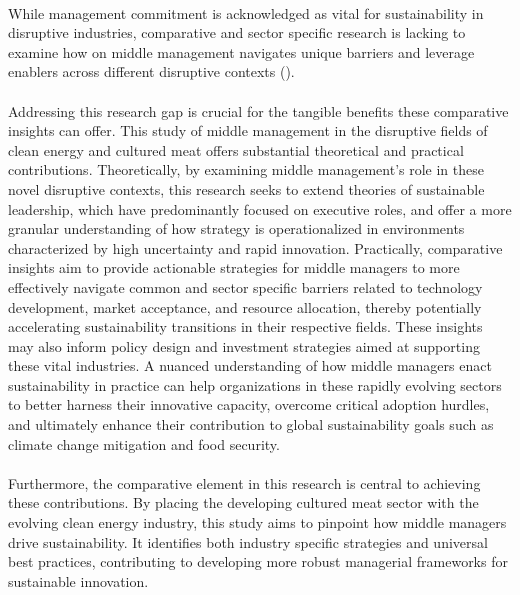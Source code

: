 \paragraph*{} While management commitment is acknowledged as vital for sustainability in disruptive industries, comparative and sector specific research is lacking to examine how on middle management navigates unique barriers and leverage enablers across different disruptive contexts (\textcite{Lozano2015, Egri2000}).

\paragraph*{} Addressing this research gap is crucial for the tangible benefits these comparative insights can offer. This study of middle management in the disruptive fields of clean energy and cultured meat offers substantial theoretical and practical contributions. 
Theoretically, by examining middle management's role in these novel disruptive contexts, this research seeks to extend theories of sustainable leadership, which have predominantly focused on executive roles, and offer a more granular understanding of how strategy is operationalized in environments characterized by high uncertainty and rapid innovation.
Practically, comparative insights aim to provide actionable strategies for middle managers to more effectively navigate common and sector specific barriers related to technology development, market acceptance, and resource allocation, thereby potentially accelerating sustainability transitions in their respective fields. These insights may also inform policy design and investment strategies aimed at supporting these vital industries.
A nuanced understanding of how middle managers enact sustainability in practice can help organizations in these rapidly evolving sectors to better harness their innovative capacity, overcome critical adoption hurdles, and ultimately enhance their contribution to global sustainability goals such as climate change mitigation and food security.

\paragraph*{} Furthermore, the comparative element in this research is central to achieving these contributions. By placing the developing cultured meat sector with the evolving clean energy industry, this study aims to pinpoint how middle managers drive sustainability. It identifies both industry specific strategies and universal best practices, contributing to developing more robust managerial frameworks for sustainable innovation.
